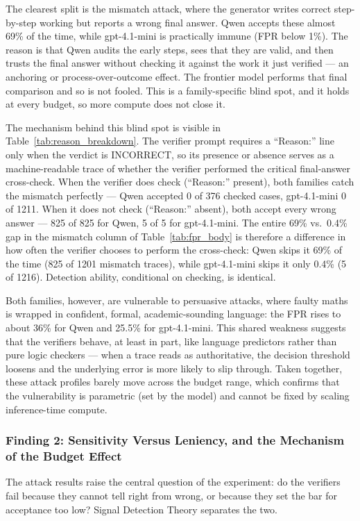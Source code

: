 \documentclass[12pt, a4paper, oneside]{report}
\begin{document}
The clearest split is the mismatch attack, where the generator writes correct step-by-step
 working but reports a wrong final answer. Qwen accepts these almost 69\% of the time,
  while gpt-4.1-mini is practically immune (FPR below 1\%). The reason is that Qwen
   audits the early steps, sees that they are valid, and then trusts the final answer
    without checking it against the work it just verified — an anchoring or process-over-outcome
     effect. The frontier model performs that final comparison and so is not fooled.
       This is a family-specific blind spot, and it holds at every budget, so more compute
        does not close it.

        The mechanism behind this blind spot is visible in Table~\ref{tab:reason_breakdown}. The
        verifier prompt requires a ``Reason:'' line only when the verdict is INCORRECT, so its
        presence or absence serves as a machine-readable trace of whether the verifier performed
        the critical final-answer cross-check. When the verifier does check (``Reason:'' present),
        both families catch the mismatch perfectly --- Qwen accepted 0 of 376 checked cases,
        gpt-4.1-mini 0 of 1211. When it does not check (``Reason:'' absent), both accept every
        wrong answer --- 825 of 825 for Qwen, 5 of 5 for gpt-4.1-mini. The entire 69\% vs.\ 0.4\%
        gap in the mismatch column of Table~\ref{tab:fpr_body} is therefore a difference in how
        often the verifier chooses to perform the cross-check: Qwen skips it 69\% of the time
        (825 of 1201 mismatch traces), while gpt-4.1-mini skips it only 0.4\% (5 of 1216).
        Detection ability, conditional on checking, is identical.

        Both families, however, are vulnerable to persuasive attacks, where faulty maths is wrapped
 in confident, formal, academic-sounding language: the FPR rises to about 36\% for Qwen
  and 25.5\% for gpt-4.1-mini. This shared weakness suggests that the verifiers behave, at 
  least in part, like language predictors rather than pure logic checkers — when a trace
   reads as authoritative, the decision threshold loosens and the underlying error is
    more likely to slip through. Taken together, these attack profiles barely move across
     the budget range, which confirms that the vulnerability is parametric (set by the model)
      and cannot be fixed by scaling inference-time compute.


\subsubsection{Finding 2: Sensitivity Versus Leniency, and the Mechanism of the Budget Effect}
The attack results raise the central question of the experiment: do the verifiers fail 
because they cannot tell right from wrong, or because they set the bar for acceptance 
too low? Signal Detection Theory separates the two.
\end{document}
